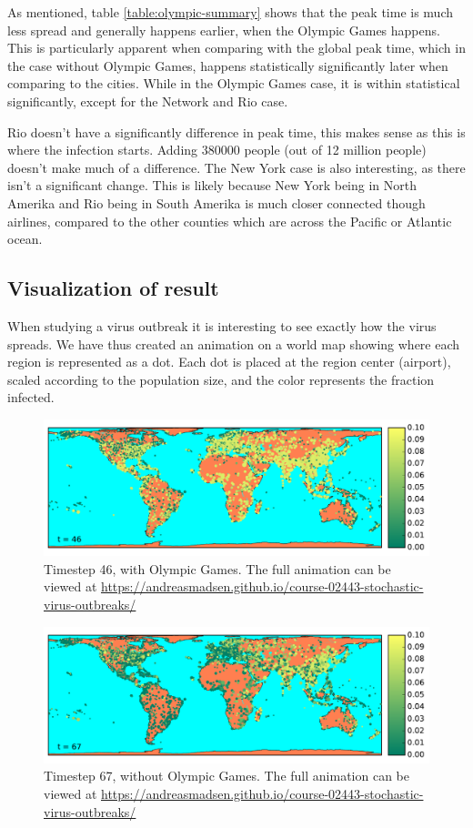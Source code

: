 As mentioned, table \ref{table:olympic-summary} shows that the peak time is much less spread and generally happens earlier, when the Olympic Games happens. This is particularly apparent when comparing with the global peak time, which in the case without Olympic Games, happens statistically significantly later when comparing to the cities. While in the Olympic Games case, it is within statistical significantly, except for the Network and Rio case.

Rio doesn't have a significantly difference in peak time, this makes sense as this is where the infection starts. Adding 380000 people (out of 12 million people) doesn't make much of a difference. The New York case is also interesting, as there isn't a significant change. This is likely because New York being in North Amerika and Rio being in South Amerika is much closer connected though airlines, compared to the other counties which are across the Pacific or Atlantic ocean. 

\subsection{Visualization of result}
When studying a virus outbreak it is interesting to see exactly how the virus spreads. We have thus created an animation on a world map showing where each region is represented as a dot. Each dot is placed at the region center (airport), scaled according to the population size, and the color represents the fraction infected.

\begin{figure}[H]
	\centering
	\includegraphics[width=1.0 \linewidth]{plots/gifs/frames/rio-46}
	\caption{Timestep 46, with Olympic Games. The full animation can be viewed at
		\url{https://andreasmadsen.github.io/course-02443-stochastic-virus-outbreaks/}}
	\label{fig:rio-46}
\end{figure}

\begin{figure}[H]
	\centering
	\includegraphics[width=1.0 \linewidth]{plots/gifs/frames/noRio-67}
	\caption{Timestep 67, without Olympic Games. The full animation can be viewed at
		\url{https://andreasmadsen.github.io/course-02443-stochastic-virus-outbreaks/}}
	\label{fig:noRio-67}
\end{figure}

